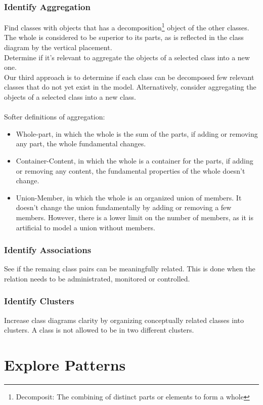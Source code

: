 \subsubsection*{Identify Aggregation \ooad[80]}
Find classes with objects that has a decomposition\footnote{Decomposit: The combining of distinct parts or elements to form a whole} object of the other classes. The whole is considered to be superior to its parts, as is reflected in the class diagram by the vertical placement.\\ 
Determine if it's relevant to aggregate the objects of a selected class into a new one. \\
Our third approach is to determine if each class can be decomposed few relevant classes that do not yet exist in the model. Alternatively, consider aggregating the objects of a selected class into a new class.
\\\\
Softer definitions of aggregation:
\begin{itemize}
    \item Whole-part, in which the whole is the sum of the parts, if adding or removing any part, the whole fundamental changes.
    \item Container-Content, in which the whole is a container for the parts, if adding or removing any content, the fundamental properties of the whole doesn't change.
    \item Union-Member, in which the whole is an organized union of members. It doesn't change the union fundamentally by adding or removing a few members. However, there is a lower limit on the number of members, as it is artificial to model a union without members.
\end{itemize}

\subsubsection*{Identify Associations}
See if the remaing class pairs can be meaningfully related. This is done when the relation needs to be administrated, monitored or controlled.

\subsubsection*{Identify Clusters}
Increase class diagrams clarity by organizing conceptually related classes into clusters. A class is not allowed to be in two different clusters.

\section{Explore Patterns \ooad[82]}
